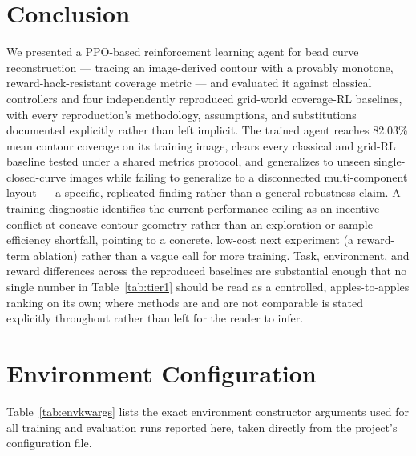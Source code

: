 \documentclass[conference]{IEEEtran}
\begin{document}
\section{Conclusion}
\label{sec:conclusion}

We presented a PPO-based reinforcement learning agent for bead curve reconstruction --- tracing an image-derived contour with a provably monotone, reward-hack-resistant coverage metric --- and evaluated it against classical controllers and four independently reproduced grid-world coverage-RL baselines, with every reproduction's methodology, assumptions, and substitutions documented explicitly rather than left implicit. The trained agent reaches 82.03\% mean contour coverage on its training image, clears every classical and grid-RL baseline tested under a shared metrics protocol, and generalizes to unseen single-closed-curve images while failing to generalize to a disconnected multi-component layout --- a specific, replicated finding rather than a general robustness claim. A training diagnostic identifies the current performance ceiling as an incentive conflict at concave contour geometry rather than an exploration or sample-efficiency shortfall, pointing to a concrete, low-cost next experiment (a reward-term ablation) rather than a vague call for more training. Task, environment, and reward differences across the reproduced baselines are substantial enough that no single number in Table~\ref{tab:tier1} should be read as a controlled, apples-to-apples ranking on its own; where methods are and are not comparable is stated explicitly throughout rather than left for the reader to infer.

\appendices

\section{Environment Configuration}
\label{app:env}

Table~\ref{tab:envkwargs} lists the exact environment constructor arguments used for all training and evaluation runs reported here, taken directly from the project's configuration file.
\end{document}
